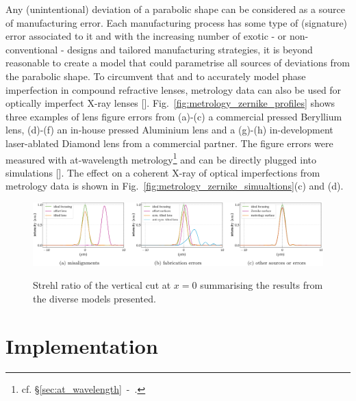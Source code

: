 \begin{refsection}
Any (unintentional) deviation of a parabolic shape can be considered as a source of manufacturing error. Each manufacturing process has some type of (signature) error associated to it and with the increasing number of exotic - or non-conventional - designs and tailored manufacturing strategies, it is beyond reasonable to create a model that could parametrise all sources of deviations from the parabolic shape. To circumvent that and to accurately model phase imperfection in compound refractive lenses, metrology data can also be used for optically imperfect X-ray lenses [\cite{Celestre2020, Chubar2020}]. Fig.~\ref{fig:metrology_zernike_profiles} shows three examples of lens figure errors from (a)-(c) a commercial pressed Beryllium lens, (d)-(f) an in-house pressed Aluminium lens and a (g)-(h) in-development laser-ablated Diamond lens from a commercial partner. The figure errors were measured with at-wavelength metrology\footnote{cf. \S\ref{sec:at_wavelength}~-~\textit{}.} and can be directly plugged into simulations [\cite{Celestre2020}]. The effect on a coherent X-ray of optical imperfections from metrology data is shown in Fig.~\ref{fig:metrology_zernike_simualtions}(c) and (d).

\begin{figure}[t]
        \centering
        {\includegraphics[width=1.\linewidth]{figures/ch04/Strehl}}
        \caption[Strehl ratio summarising the results from the diverse models presented]{Strehl ratio of the vertical cut at $x=0$ summarising the results from the diverse models presented.} \label{fig:Strehl_m}
\end{figure}

\section{Implementation}


\end{refsection}
